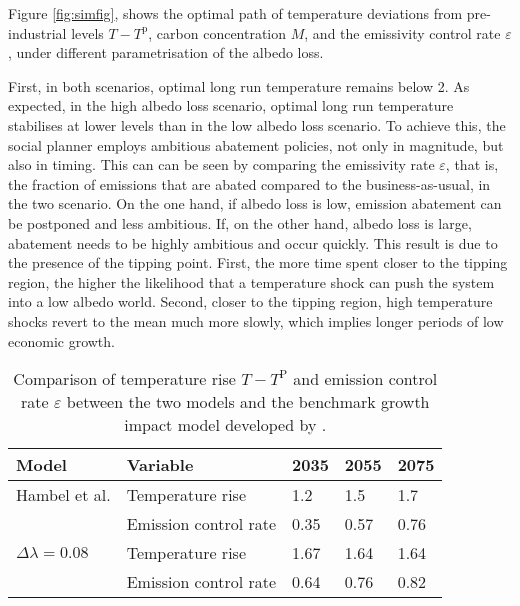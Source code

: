 \documentclass[../../main.tex]{subfiles}
\begin{document}
Figure \ref{fig:simfig}, shows the optimal path of temperature deviations from pre-industrial levels $T - T^{\mathrm{p}}$, carbon concentration $M$, and the emissivity control rate $\varepsilon$, under different parametrisation of the albedo loss.

First, in both scenarios, optimal long run temperature remains below 2\degree. As expected, in the high albedo loss scenario, optimal long run temperature stabilises at lower levels than in the low albedo loss scenario. To achieve this, the social planner employs ambitious abatement policies, not only in magnitude, but also in timing. This can can be seen by comparing the emissivity rate $\varepsilon$, that is, the fraction of emissions that are abated compared to the business-as-usual, in the two scenario. On the one hand, if albedo loss is low, emission abatement can be postponed and less ambitious. If, on the other hand, albedo loss is large, abatement needs to be highly ambitious and occur quickly. This result is due to the presence of the tipping point. First, the more time spent closer to the tipping region, the higher the likelihood that a temperature shock can push the system into a low albedo world. Second, closer to the tipping region, high temperature shocks revert to the mean much more slowly, which implies longer periods of low economic growth.

\begin{table}[H]
    \centering
    \begin{tabular}{ |p{3cm}||p{4cm}||p{1.5cm}|p{1.5cm}|p{1.5cm}|  }
        \hline
        Model & Variable & 2035 & 2055 & 2075 \\
        \hline \hline
        Hambel et al.
        & Temperature rise & 1.2 & 1.5 & 1.7 \\
        & Emission control rate & 0.35 & 0.57 & 0.76 \\
        \hline 
        $\Delta \lambda = 0.08$
        & Temperature rise & 1.67 & 1.64 & 1.64 \\
        & Emission control rate & 0.64 & 0.76 & 0.82 \\
        \hline\hline
    \end{tabular}
    \caption{Comparison of temperature rise $T - T^{\mathrm{P}}$ and emission control rate $\varepsilon$ between the two models and the benchmark growth impact model developed by .}
    \label{table:hambel-comparison}
\end{table}
\end{document}

